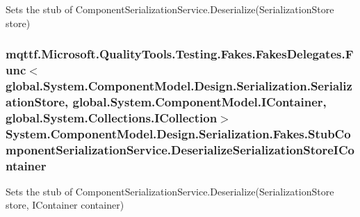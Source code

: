 Sets the stub of Component\-Serialization\-Service.\-Deserialize(\-Serialization\-Store store)

\hypertarget{class_system_1_1_component_model_1_1_design_1_1_serialization_1_1_fakes_1_1_stub_component_serialization_service_a4ae8cc7468a930bb20e70f7e51eb146a}{
\subsubsection[{Deserialize\-Serialization\-Store\-I\-Container}]{\setlength{\rightskip}{0pt plus 5cm}mqttf.\-Microsoft.\-Quality\-Tools.\-Testing.\-Fakes.\-Fakes\-Delegates.\-Func$<$global.\-System.\-Component\-Model.\-Design.\-Serialization.\-Serialization\-Store, global.\-System.\-Component\-Model.\-I\-Container, global.\-System.\-Collections.\-I\-Collection$>$ System.\-Component\-Model.\-Design.\-Serialization.\-Fakes.\-Stub\-Component\-Serialization\-Service.\-Deserialize\-Serialization\-Store\-I\-Container}}\label{class_system_1_1_component_model_1_1_design_1_1_serialization_1_1_fakes_1_1_stub_component_serialization_service_a4ae8cc7468a930bb20e70f7e51eb146a}


Sets the stub of Component\-Serialization\-Service.\-Deserialize(\-Serialization\-Store store, I\-Container container)

